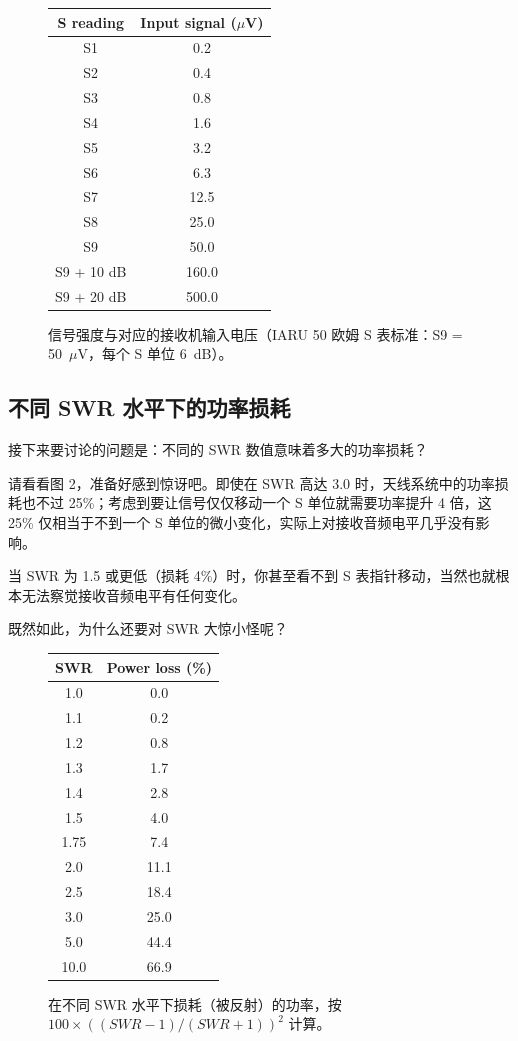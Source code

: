 \documentclass[11pt]{article}
\begin{document}
\begin{figure}[htbp]
  \centering
  \begin{tabular}{cc}
    \toprule
    S reading   & Input signal ($\mu$V) \\
    \midrule
    S1          & 0.2   \\
    S2          & 0.4   \\
    S3          & 0.8   \\
    S4          & 1.6   \\
    S5          & 3.2   \\
    S6          & 6.3   \\
    S7          & 12.5  \\
    S8          & 25.0  \\
    S9          & 50.0  \\
    S9 + 10 dB  & 160.0 \\
    S9 + 20 dB  & 500.0 \\
    \bottomrule
  \end{tabular}
  \caption{信号强度与对应的接收机输入电压（IARU 50 欧姆 S 表标准：S9 = 50~$\mu$V，每个 S 单位 6~dB）。}
  \label{fig:fig1}
\end{figure}

\subsection*{不同 SWR 水平下的功率损耗}

接下来要讨论的问题是：不同的 SWR 数值意味着多大的功率损耗？

请看看图 2，准备好感到惊讶吧。即使在 SWR 高达 3.0 时，天线系统中的功率损耗也不过 25\%；考虑到要让信号仅仅移动一个 S 单位就需要功率提升 4 倍，这 25\% 仅相当于不到一个 S 单位的微小变化，实际上对接收音频电平几乎没有影响。

当 SWR 为 1.5 或更低（损耗 4\%）时，你甚至看不到 S 表指针移动，当然也就根本无法察觉接收音频电平有任何变化。

既然如此，为什么还要对 SWR 大惊小怪呢？

\begin{figure}[htbp]
  \centering
  \begin{tabular}{cc}
    \toprule
    SWR   & Power loss (\%) \\
    \midrule
    1.0   & 0.0   \\
    1.1   & 0.2   \\
    1.2   & 0.8   \\
    1.3   & 1.7   \\
    1.4   & 2.8   \\
    1.5   & 4.0   \\
    1.75  & 7.4   \\
    2.0   & 11.1  \\
    2.5   & 18.4  \\
    3.0   & 25.0  \\
    5.0   & 44.4  \\
    10.0  & 66.9  \\
    \bottomrule
  \end{tabular}
  \caption{在不同 SWR 水平下损耗（被反射）的功率，按
    $100\times((SWR-1)/(SWR+1))^2$ 计算。}
  \label{fig:fig2}
\end{figure}
\end{document}
